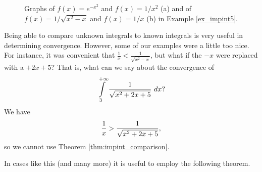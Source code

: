 \begin{example}
\begin{enumerate}
\end{enumerate}
\begin{figure}[H]
\centering
\qquad
{}
\caption{Graphs of $f(x) = e^{-x^2}$ and $f(x)= 1/x^2$ (a) and of $f(x) = 1/\sqrt{x^2-x}$ and $f(x)= 1/x$ (b) in Example \ref{ex_impint5}.}
\end{figure} 
\end{example}


Being able to compare unknown integrals to known integrals is very useful in determining convergence. However, some of our examples were a little too nice. For instance, it was convenient that \linebreak $\frac{1}x < \frac{1}{\sqrt{x^2-x}}$, but what if the $-x$ were replaced with a $+2x+5$? That is, what can we say about the convergence of
$$\displaystyle \int\limits_3^{+\infty}\frac{1}{\sqrt{x^2+2x+5}}\ dx?$$
We have 
$$\displaystyle \frac{1}{x} > \frac1{\sqrt{x^2+2x+5}},$$
so we cannot use Theorem \ref{thm:impint_comparison}.

In cases like this (and many more) it is useful to employ the following theorem.


